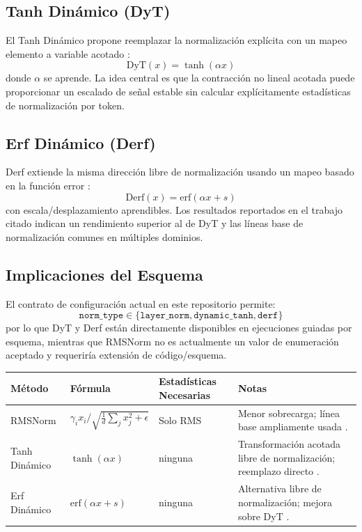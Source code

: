 \documentclass[11pt,a4paper]{article}
\begin{document}
\subsection{Tanh Dinámico (DyT)}
El Tanh Dinámico propone reemplazar la normalización explícita con un mapeo elemento a variable acotado \citep{zhu_transformers_2025}:
\[
\mathrm{DyT}(x)=\tanh(\alpha x)
\]
donde $\alpha$ se aprende. La idea central es que la contracción no lineal acotada puede proporcionar un escalado de señal estable sin calcular explícitamente estadísticas de normalización por token.

\subsection{Erf Dinámico (Derf)}
Derf extiende la misma dirección libre de normalización usando un mapeo basado en la función error \citep{chen_stronger_2025}:
\[
\mathrm{Derf}(x)=\mathrm{erf}(\alpha x+s)
\]
con escala/desplazamiento aprendibles. Los resultados reportados en el trabajo citado indican un rendimiento superior al de DyT y las líneas base de normalización comunes en múltiples dominios.

\subsection{Implicaciones del Esquema}
El contrato de configuración actual en este repositorio permite:
\[
\texttt{norm\_type}\in\{\texttt{layer\_norm},\texttt{dynamic\_tanh},\texttt{derf}\}
\]
por lo que DyT y Derf están directamente disponibles en ejecuciones guiadas por esquema, mientras que RMSNorm no es actualmente un valor de enumeración aceptado y requeriría extensión de código/esquema.

\scriptsize
\begin{longtable}{p{2.2cm}p{3.4cm}p{2.0cm}p{4.0cm}}
\toprule
\textbf{Método} & \textbf{Fórmula} & \textbf{Estadísticas Necesarias} & \textbf{Notas} \\
\midrule
\endhead
RMSNorm & $\gamma_i x_i/\sqrt{\frac{1}{d}\sum_j x_j^2+\epsilon}$ & Solo RMS & Menor sobrecarga; línea base ampliamente usada \citep{zhang_root_2019}. \\
Tanh Dinámico & $\tanh(\alpha x)$ & ninguna & Transformación acotada libre de normalización; reemplazo directo \citep{zhu_transformers_2025}. \\
Erf Dinámico & $\mathrm{erf}(\alpha x+s)$ & ninguna & Alternativa libre de normalización; mejora sobre DyT \citep{chen_stronger_2025}. \\
\bottomrule
\end{longtable}
\normalsize
\end{document}

